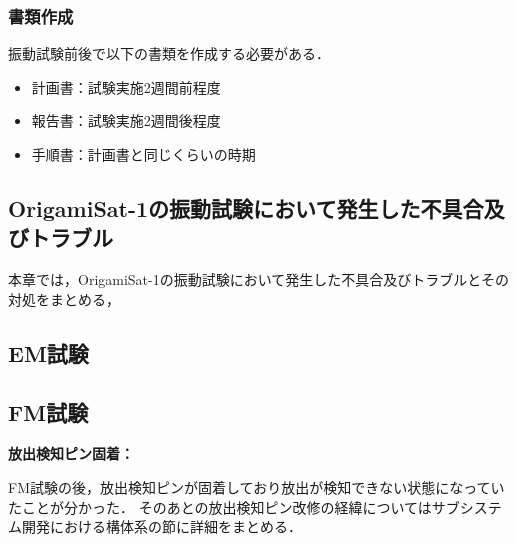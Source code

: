 \subsubsection{書類作成}
振動試験前後で以下の書類を作成する必要がある．
\begin{itemize}
	\item 計画書：試験実施2週間前程度
	\item 報告書：試験実施2週間後程度
	\item 手順書：計画書と同じくらいの時期
\end{itemize}

\subsection{OrigamiSat-1の振動試験において発生した不具合及びトラブル}
本章では，OrigamiSat-1の振動試験において発生した不具合及びトラブルとその対処をまとめる，

\subsection{EM試験}

\subsection{FM試験}
\textbf{放出検知ピン固着：}\par
FM試験の後，放出検知ピンが固着しており放出が検知できない状態になっていたことが分かった．
そのあとの放出検知ピン改修の経緯についてはサブシステム開発における構体系の節に詳細をまとめる．

